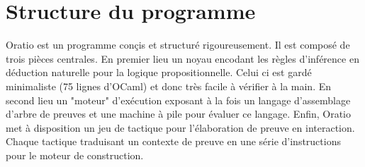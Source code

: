\documentclass{article}
\begin{document}
\section{Structure du programme}

Oratio est un programme conçis et structuré rigoureusement. Il est composé de trois pièces centrales.
En premier lieu un noyau encodant les règles d'inférence en déduction naturelle pour la logique propositionnelle. Celui ci est gardé minimaliste (75 lignes d'OCaml) et donc très facile à vérifier à la main. En second lieu un "moteur" d'exécution exposant à la fois un langage d'assemblage d'arbre de preuves et une machine à pile pour évaluer ce langage. Enfin, Oratio met à disposition un jeu de tactique pour l'élaboration de preuve en interaction. Chaque tactique traduisant un contexte de preuve en une série d'instructions pour le moteur de construction.
\end{document}
